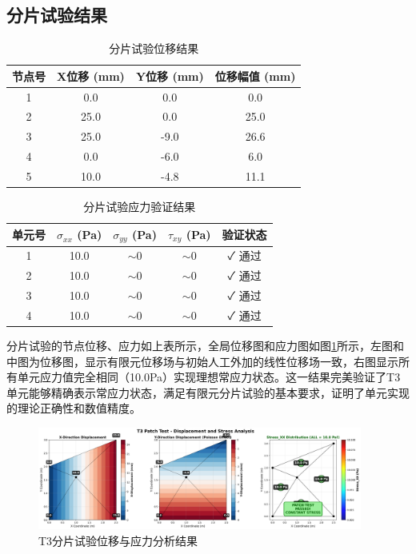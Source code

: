 \documentclass[12pt,a4paper]{article}
\begin{document}
\subsection{分片试验结果}

\begin{table}[H]
\centering
\caption{分片试验位移结果}
\begin{tabular}{cccc}
\toprule
节点号 & X位移 (mm) & Y位移 (mm) & 位移幅值 (mm) \\
\midrule
1 & 0.0 & 0.0 & 0.0 \\
2 & 25.0 & 0.0 & 25.0 \\
3 & 25.0 & -9.0 & 26.6 \\
4 & 0.0 & -6.0 & 6.0 \\
5 & 10.0 & -4.8 & 11.1 \\
\bottomrule
\end{tabular}
\end{table}

\begin{table}[H]
\centering
\caption{分片试验应力验证结果}
\begin{tabular}{ccccc}
\toprule
单元号 & $\sigma_{xx}$ (Pa) & $\sigma_{yy}$ (Pa) & $\tau_{xy}$ (Pa) & 验证状态 \\
\midrule
1 & 10.0 & $\sim$0 & $\sim$0 & ✓ 通过 \\
2 & 10.0 & $\sim$0 & $\sim$0 & ✓ 通过 \\
3 & 10.0 & $\sim$0 & $\sim$0 & ✓ 通过 \\
4 & 10.0 & $\sim$0 & $\sim$0 & ✓ 通过 \\
\bottomrule
\end{tabular}
\end{table}

分片试验的节点位移、应力如上表所示，全局位移图和应力图如图\ref{fig:t3_displacement_stress}所示，左图和中图为位移图，显示有限元位移场与初始人工外加的线性位移场一致，右图显示所有单元应力值完全相同（10.0Pa）实现理想常应力状态。这一结果完美验证了T3单元能够精确表示常应力状态，满足有限元分片试验的基本要求，证明了单元实现的理论正确性和数值精度。

\begin{figure}[H]
\centering
\includegraphics[width=0.95\textwidth]{img/t3_displacement_stress_analysis.png}
\caption{T3分片试验位移与应力分析结果}
\label{fig:t3_displacement_stress}
\end{figure}
\end{document}

